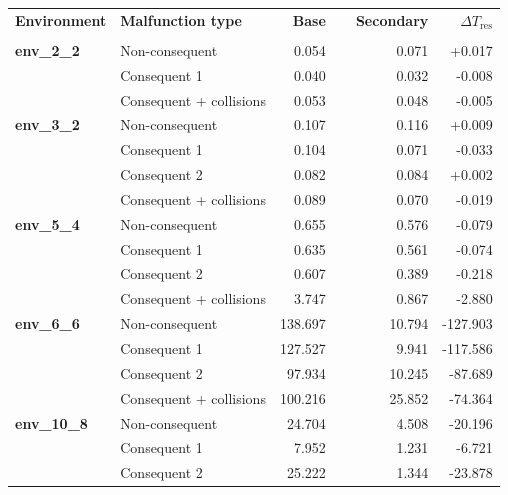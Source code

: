 \documentclass[runningheads]{llncs}
\begin{document}
\begin{table}[htbp]
	\centering
	\footnotesize
	\setlength{\tabcolsep}{4pt}
	\renewcommand{\arraystretch}{0.9}
	\begin{tabular}{@{}llrrr@{}}
		\toprule
		\textbf{Environment} &
		\textbf{Malfunction type} &
		\textbf{Base} &
		\textbf{~~Secondary} &
		\textbf{$\Delta T_{\mathrm{res}}$} \\
		& &
		\makecell[r]{\textbf{$T_{\mathrm{res}}$}} &
		\makecell[r]{\textbf{$T_{\mathrm{res}}$}} &
		\makecell[r]{\textbf{}} \\
		\midrule

		\textbf{env\_2\_2}
		& Non-consequent & 0.054 & 0.071 & +0.017 \\
		& Consequent 1 & 0.040 & 0.032 & -0.008 \\
		& Consequent + collisions & 0.053 & 0.048 & -0.005 \\
		
		\midrule
		
		\textbf{env\_3\_2}
		& Non-consequent & 0.107 & 0.116 & +0.009 \\
		& Consequent 1 & 0.104 & 0.071 & -0.033 \\
		& Consequent 2 & 0.082 & 0.084 & +0.002 \\
		& Consequent + collisions & 0.089 & 0.070 & -0.019 \\
		
		\midrule
		
		\textbf{env\_5\_4}
		& Non-consequent & 0.655 & 0.576 & -0.079 \\
		& Consequent 1 & 0.635 & 0.561 & -0.074 \\
		& Consequent 2 & 0.607 & 0.389 & -0.218 \\
		& Consequent + collisions & 3.747 & 0.867 & -2.880 \\
		
		\midrule
		
		\textbf{env\_6\_6}
		& Non-consequent & 138.697 & 10.794 & -127.903 \\
		& Consequent 1 & 127.527 & 9.941 & -117.586 \\
		& Consequent 2 & 97.934 & 10.245 & -87.689 \\
		& Consequent + collisions & 100.216 & 25.852 & -74.364 \\

		\midrule
		
		\textbf{env\_10\_8}
		& Non-consequent & 24.704 & 4.508 & -20.196 \\
		& Consequent 1 & 7.952 & 1.231 & -6.721 \\
		& Consequent 2 & 25.222 & 1.344 & -23.878 \\
		

\end{tabular}
\end{table}
\end{document}
